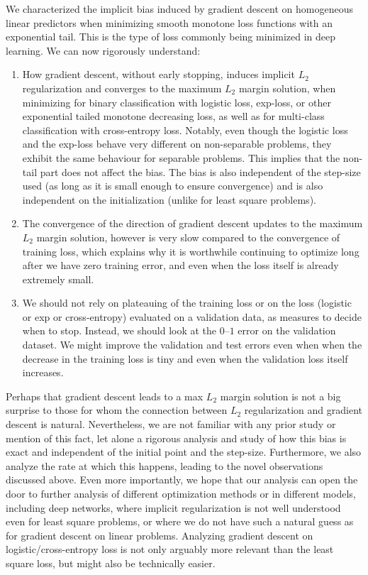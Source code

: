 \documentclass[twoside,11pt,english]{article}
\begin{document}
We characterized the implicit bias induced by gradient descent on homogeneous linear predictors when 
minimizing smooth monotone loss functions with an exponential tail.
This is the type of loss commonly being minimized in deep learning.
We can now rigorously understand: 
\begin{enumerate}
\item How gradient descent, without early stopping, induces implicit $L_{2}$
regularization and converges to the maximum $L_{2}$ margin solution,
when minimizing for binary classification with logistic loss, exp-loss, or other exponential tailed monotone
decreasing loss, as well as for multi-class classification with cross-entropy loss. Notably, even though the logistic loss and the exp-loss behave very different on non-separable problems, they exhibit the same behaviour for separable problems. This implies that the non-tail
part does not affect the bias. The bias is also independent of the step-size
used (as long as it is small enough to ensure convergence) and  is also independent on the initialization (unlike for least square problems). 
\item The convergence of the direction of gradient descent updates to the maximum $L_2$ margin solution, however is  very slow compared to the convergence of training loss, which explains why it is worthwhile
continuing to optimize long after we have zero training error, and
even when the loss itself is already extremely small. 
\item We should not rely on plateauing  of the training loss or on the loss (logistic or exp or cross-entropy)  evaluated on a validation data, as measures to decide when to stop. Instead, we should look at the $0$--$1$ error on the validation dataset. We might improve the validation and test errors even when  when the decrease in the training loss is tiny and even when the validation loss itself increases. 
\end{enumerate}
Perhaps that gradient descent leads to a max $L_{2}$ margin solution
is not a big surprise to those for whom the connection between $L_{2}$
regularization and gradient descent is natural. Nevertheless, we are
not familiar with any prior study or mention of this fact, let alone
a rigorous analysis and study of how this bias is exact and independent
of the initial point and the step-size. Furthermore, we also analyze
the rate at which this happens, leading to the novel observations
discussed above. Even more importantly, we hope that our analysis
can open the door to further analysis of different optimization methods
or in different models, including deep networks, where implicit regularization
is not well understood even for least square problems, or where we
do not have such a natural guess as for gradient descent on linear
problems. Analyzing gradient descent on logistic/cross-entropy loss
is not only arguably more relevant than the least square loss, but
might also be technically easier.
\end{document}
